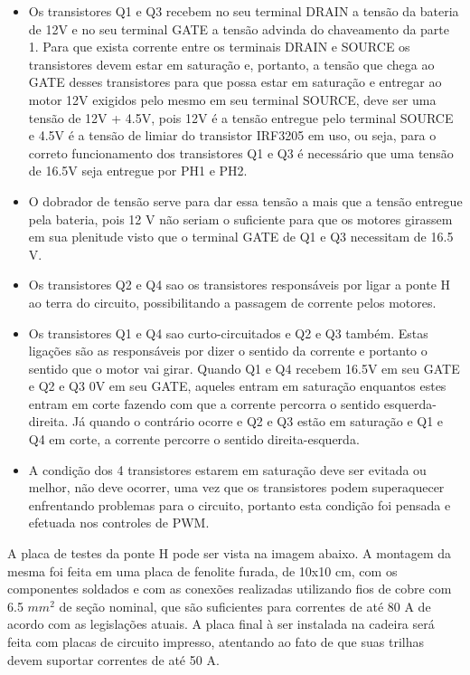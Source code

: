 \begin{itemize}
	\item Os transistores Q1 e Q3 recebem no seu terminal DRAIN a tensão da bateria de 12V e no seu terminal GATE a tensão advinda do chaveamento da parte 1. Para que exista corrente entre os terminais DRAIN e SOURCE os transistores devem estar em saturação e, portanto, a tensão que chega ao GATE desses transistores para que possa estar em saturação e entregar ao motor 12V exigidos pelo mesmo em seu terminal SOURCE, deve ser uma tensão de 12V + 4.5V, pois 12V é a tensão entregue pelo terminal SOURCE e 4.5V é a tensão de limiar do transistor IRF3205 em uso, ou seja, para o correto funcionamento dos transistores Q1 e Q3 é necessário que uma tensão de 16.5V seja entregue por PH1 e PH2.
    \item O dobrador de tensão serve para dar essa tensão a mais que a tensão entregue pela bateria, pois 12 V não seriam o suficiente para que os motores girassem em sua plenitude visto que o terminal GATE de Q1 e Q3 necessitam de 16.5 V.
    \item Os transistores Q2 e Q4 sao os transistores responsáveis por ligar a ponte H ao terra do circuito, possibilitando a passagem de corrente pelos motores. 
    \item Os transistores Q1 e Q4 sao curto-circuitados e Q2 e Q3 também. Estas ligações são as responsáveis por dizer o sentido da corrente e portanto o sentido que o motor vai girar. Quando Q1 e Q4 recebem 16.5V em seu GATE e Q2 e Q3 0V em seu GATE, aqueles entram em saturação enquantos estes entram em corte fazendo com que a corrente percorra o sentido esquerda-direita. Já quando o contrário ocorre e Q2 e Q3 estão em saturação e Q1 e Q4 em corte, a corrente percorre o sentido direita-esquerda. 
    \item A condição dos 4 transistores estarem em saturação deve ser evitada ou melhor, não deve ocorrer, uma vez que os transistores podem superaquecer enfrentando problemas para o circuito, portanto esta condição foi pensada e efetuada nos controles de PWM.

\end{itemize}

A placa de testes da ponte H pode ser vista na imagem abaixo. A montagem da
mesma foi feita em uma placa de fenolite furada, de 10x10 cm, com os
componentes soldados e com as conexões realizadas utilizando fios de cobre com
6.5 \(mm^2\) de seção nominal, que são suficientes para correntes de até 80 A
de acordo com as legislações atuais. A placa final à ser instalada na cadeira
será feita com placas de circuito impresso, atentando ao fato de que suas
trilhas devem suportar correntes de até 50 A.

